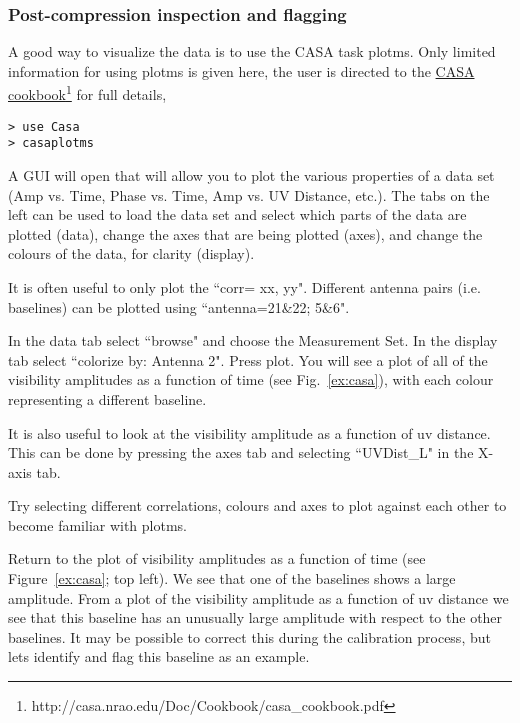 

\subsubsection{Post-compression inspection and flagging}

A good way to visualize the data is to use the CASA task plotms. Only limited information for using plotms is given here, the user is directed to the \href{http://casa.nrao.edu/Doc/Cookbook/casa_cookbook.pdf}{CASA cookbook}\footnote{http://casa.nrao.edu/Doc/Cookbook/casa\_cookbook.pdf} for full details,
\begin{verbatim}
> use Casa
> casaplotms
\end{verbatim}

A GUI will open that will allow you to plot the various properties of a data set (Amp vs. Time, Phase vs. Time, Amp vs. UV Distance, etc.). The tabs on the left can be used to load the data set and select which parts of the data are plotted (data), change the axes that are being plotted (axes), and change the colours of the data, for clarity (display).

It is often useful to only plot the ``corr= xx, yy". Different antenna pairs (i.e. baselines) can be plotted using ``antenna=21\&22; 5\&6".

In the data tab select ``browse" and choose the Measurement Set. In the display tab select ``colorize by: Antenna 2". Press plot. You will see a plot of all of the visibility amplitudes as a function of time (see Fig.~\ref{ex:casa}), with each colour representing a different baseline.

It is also useful to look at the visibility amplitude as a function of uv distance. This can be done by pressing the axes tab and selecting ``UVDist\_L" in the X-axis tab.

Try selecting different correlations, colours and axes to plot against each other to become familiar with plotms.

Return to the plot of visibility amplitudes as a function of time (see Figure~\ref{ex:casa}; top left). We see that one of the baselines shows a large amplitude. From a plot of the visibility amplitude as a function of uv distance we see that this baseline has an unusually large amplitude with respect to the other baselines. It may be possible to correct this during the calibration process, but lets identify and flag this baseline as an example.

